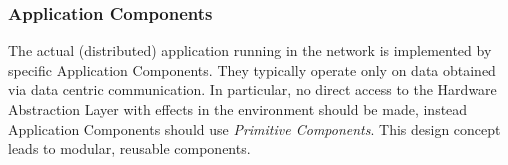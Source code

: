 \subsubsection{Application Components}

The actual (distributed) application running in the network is implemented by specific Application Components.
They typically operate only on data obtained via data centric communication.
In particular, no direct access to the Hardware Abstraction Layer with effects in the environment should be made,
instead Application Components should use \emph{Primitive Components}.
This design concept leads to modular, reusable components.



%
%



